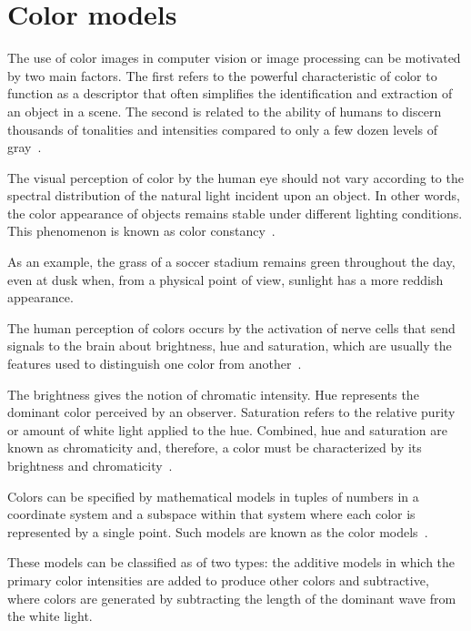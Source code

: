 \section{Color models}
\label{sec:color_models}

The use of color images in computer vision or image processing can be motivated by two main factors. The first refers to the powerful characteristic of color to function as a descriptor that often simplifies the identification and extraction of an object in a scene. The second is related to the ability of humans to discern thousands of tonalities and intensities compared to only a few dozen levels of gray~\citep{gonzalez:02}.

The visual perception of color by the human eye should not vary according to the spectral distribution of the natural light incident upon an object. In other words, the color appearance of objects remains stable under different lighting conditions. This phenomenon is known as color constancy~\citep{gevers:12}.

As an example, the grass of a soccer stadium remains green throughout the day, even at dusk when, from a physical point of view, sunlight has a more reddish appearance.

The human perception of colors occurs by the activation of nerve cells that send signals to the brain about brightness, hue and saturation, which are usually the features used to distinguish one color from another~\citep{gonzalez:02}.

The brightness gives the notion of chromatic intensity. Hue represents the dominant color perceived by an observer. Saturation refers to the relative purity or amount of white light applied to the hue. Combined, hue and saturation are known as chromaticity and, therefore, a color must be characterized by its brightness and chromaticity~\citep{gonzalez:02}.

Colors can be specified by mathematical models in tuples of numbers in a coordinate system and a subspace within that system where each color is represented by a single point. Such models are known as the color models~\citep{gonzalez:02}.

These models can be classified as of two types: the additive models in which the primary color intensities are added to produce other colors and subtractive, where colors are generated by subtracting the length of the dominant wave from the white light.

